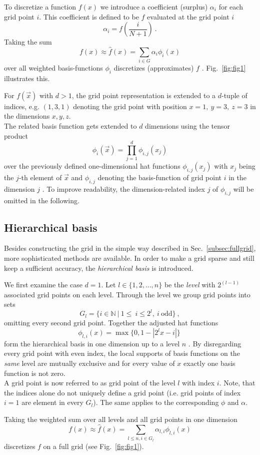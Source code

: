 \par

To discretize a function $f(x)$ we introduce a coefficient (surplus)
$\alpha_i$ for each grid point $i$. This coefficient is defined to be
$f$ evaluated at the grid point $i$
$$\alpha_i = f(\frac{i}{N+1}) \ .$$
Taking the sum
$$ f(x) \approx  \hat{f}(x) = \sum_{i \in G}{\alpha_i \phi_i(x)} $$
over all weighted basis-functions $\phi_i$ discretizes (approximates) $f$
\cite{disspfl}.
Fig.~\ref{fig:fig1} illustrates this.

\par

For $f(\vec{x})$ with $d > 1$, the grid point representation is extended to
a $d$-tuple of indices, e.g. $(1,3,1)$ denoting the grid point with position
$x = 1, \ y = 3, \ z = 3$ in the dimensions $x,y,z$. \\
The related basis function gets extended to $d$ dimensions using the tensor
product
$$\phi_i(\vec{x}) = \prod_{j=1}^d{\phi_{i,j}(x_j)}$$
over the previously defined one-dimensional hat functions
$\phi_{i,j}(x_j)$ with $x_j$ being the $j$-th element of $\vec{x}$ and
$\phi_{i,j}$ denoting the basis-function of grid point $i$ in the dimension
$j$ \cite{disspfl}.
To improve readability, the dimension-related index $j$ of $\phi_{i,j}$
will be omitted in the following.

\subsection{Hierarchical basis}
Besides constructing the grid in the simple way described in Sec.~\ref{subsec:fullgrid},
more sophisticated methods are available. In order to make a grid
sparse and still keep a sufficient accuracy, the
\emph{hierarchical basis} is introduced.
\par
We first examine the case $d = 1$.
Let $l \in \{1,2,\dots,n\}$ be the \emph{level} with $2^{(l-1)}$ associated
grid points on each level. Through the level we group grid points
into sets
$$G_l = \{i \in \mathbb{N} \ | \ 1 \leq \ i \leq 2^l, \ i \ \text{odd}\} \ ,$$
omitting every second grid point. Together the adjusted hat functions
$$\phi_{l,i}(x) = \max\{0, 1 - |2^lx - i|\} \ $$
form the hierarchical basis in one dimension up to a level $n$
\cite{disspfl}.
By disregarding every
grid point with even index, the local supports of basis functions on the \emph{same}
level are mutually exclusive and for every value of $x$ exactly one basis
function is not zero. \\
A grid point is now referred to as grid point of the level $l$ with index $i$.
Note, that the indices alone do not uniquely define a grid point (i.e. grid
points of index $i = 1$ are element in every $G_l$). The same applies to
the corresponding $\phi$ and $\alpha$.
\par
Taking the weighted sum over all levels and all grid points in one dimension
$$ f(x) \approx \hat{f}(x) =  \sum_{l \leq n, i \in G_l}{\alpha_{l,i}\phi_{l,i}(x)}$$
discretizes $f$ on a full grid \cite{disspfl} (see Fig.~\ref{fig:fig1}).

